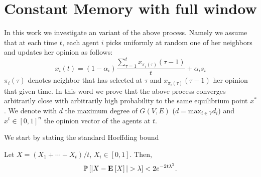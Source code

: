 \section{Constant Memory with full window}

In this work we investigate an variant of the above process. Namely we assume that at each time $t$, each agent $i$ picks uniformly at random one of her neighbors and updates her opinion as follows: $$x_i(t) = (1-\alpha_i)\frac{\sum_{\tau=1}^tx_{\pi_i(\tau)}(\tau-1)}{t} + \alpha_i s_i$$ $\pi_i(\tau)$ denotes neighbor that has selected at $\tau$ and $x_{\pi_i(\tau)}(\tau-1)$ her opinion that given time. In this word we prove that the above process converges arbitrarily close with arbitrarily high probability to the same equilibrium point $x^*$.
We denote with $d$ the maximum degree of $G(V,E)$ ($d=\text{max}_{i \in V}d_i$) and $x^t \in [0,1]^n$ the opinion vector of the agents at $t$.

We start by stating the standard Hoeffding bound

\begin{lemma}\label{l:hoeffding}
  Let $X = (X_1 +\cdots + X_t) /t$, $X_i \in [0,1]$.
  Then,
  \[
    \Prob{|X - \Exp{X} | > \lambda} < 2 e^{-2 t \lambda^2}.
  \]
\end{lemma}

